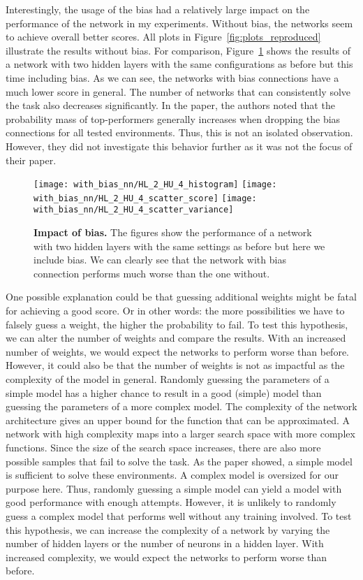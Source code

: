 Interestingly, the usage of the bias had a relatively large impact on the performance of the network in my experiments. Without bias, the networks seem to achieve overall better scores. All plots in Figure~\ref{fig:plots_reproduced} illustrate the results without bias. For comparison, Figure~\ref{fig:comparison_bias} shows the results of a network with two hidden layers with the same configurations as before but this time including bias. As we can see, the networks with bias connections have a much lower score in general. The number of networks that can consistently solve the task also decreases significantly. In the paper, the authors noted that the probability mass of top-performers generally increases when dropping the bias connections for all tested environments. Thus, this is not an isolated observation. However, they did not investigate this behavior further as it was not the focus of their paper.
\begin{figure}[ht]
\centering
\texttt{[image: with\_bias\_nn/HL\_2\_HU\_4\_histogram]}
\texttt{[image: with\_bias\_nn/HL\_2\_HU\_4\_scatter\_score]}
\texttt{[image: with\_bias\_nn/HL\_2\_HU\_4\_scatter\_variance]}
\caption[Impact of Bias]{
  \textbf{Impact of bias.}
  The figures show the performance of a network with two hidden layers with the same settings as before but here we include bias. We can clearly see that the network with bias connection performs much worse than the one without.
}
\label{fig:comparison_bias}
\end{figure}
One possible explanation could be that guessing additional weights might be fatal for achieving a good score. Or in other words: the more possibilities we have to falsely guess a weight, the higher the probability to fail. To test this hypothesis, we can alter the number of weights and compare the results. With an increased number of weights, we would expect the networks to perform worse than before. However, it could also be that the number of weights is not as impactful as the complexity of the model in general. Randomly guessing the parameters of a simple model has a higher chance to result in a good (simple) model than guessing the parameters of a more complex model. The complexity of the network architecture gives an upper bound for the function that can be approximated. A network with high complexity maps into a larger search space with more complex functions. Since the size of the search space increases, there are also more possible samples that fail to solve the task. As the paper showed, a simple model is sufficient to solve these environments. A complex model is oversized for our purpose here. Thus, randomly guessing a simple model can yield a model with good performance with enough attempts. However, it is unlikely to randomly guess a complex model that performs well without any training involved. To test this hypothesis, we can increase the complexity of a network by varying the number of hidden layers or the number of neurons in a hidden layer. With increased complexity, we would expect the networks to perform worse than before.

